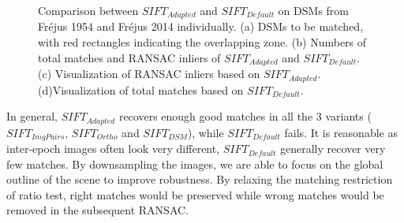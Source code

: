 \begin{figure}[htbp]
\begin{center}
{		}
		\caption{Comparison between $SIFT_{Adapted}$ and $SIFT_{Default}$ on \ac{DSM}s from Fr{\'e}jus 1954 and Fr{\'e}jus 2014 individually. (a) \ac{DSM}s to be matched, with red rectangles indicating the overlapping zone. (b) Numbers of total matches and RANSAC inliers of $SIFT_{Adapted}$ and $SIFT_{Default}$. (c) Visualization of RANSAC inliers based on $SIFT_{Adapted}$. (d)Visualization of total matches based on $SIFT_{Default}$.}
		\label{SIFTComp_DSM}
	\end{center}
\end{figure} 

In general, $SIFT_{Adapted}$ recovers enough good matches in all the 3 variants ($SIFT_{ImgPairs}$, $SIFT_{Ortho}$ and $SIFT_{DSM}$), while $SIFT_{Default}$ fails. It is reasonable as inter-epoch images often look very different, $SIFT_{Default}$ generally recover very few matches. By downsampling the images, we are able to focus on the global outline of the scene to improve robustness. 
By relaxing the matching restriction of ratio test, right matches would be preserved while wrong matches would be removed in the subsequent RANSAC.\\


